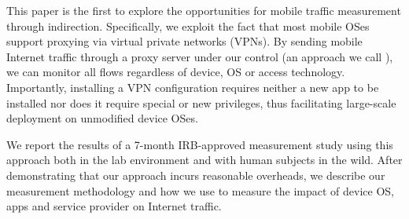 This paper is the first to explore the opportunities for mobile traffic measurement through indirection. 
Specifically, we exploit the fact that most mobile OSes support proxying via virtual private networks (VPNs). 
By sending mobile Internet traffic through a proxy server under our control (an approach we call \platname), we can monitor all flows regardless of device, OS or access technology. 
Importantly, installing a VPN configuration requires neither a new app to be installed nor does it require special or new privileges, thus facilitating large-scale deployment on unmodified device OSes.

We report the results of a 7-month IRB-approved measurement study using this approach both in the lab environment and with human subjects in the wild. 
After demonstrating that our approach incurs reasonable overheads, we describe our measurement methodology and how we use \platname to measure the impact of device OS, apps and service provider on Internet traffic.

